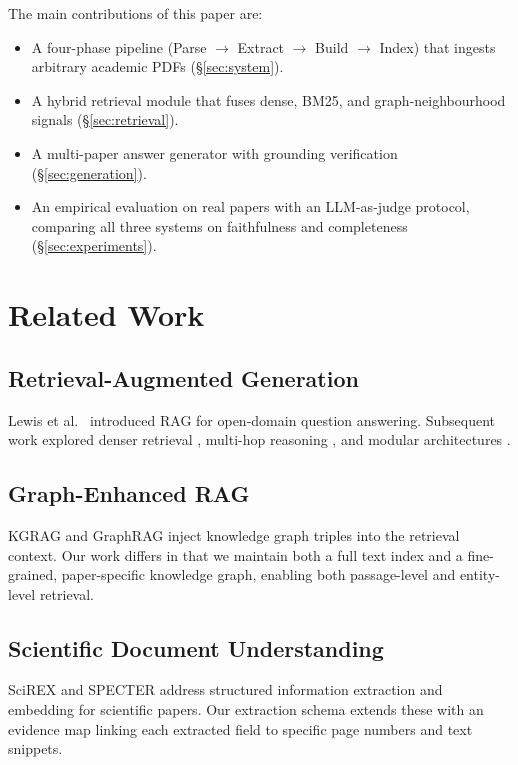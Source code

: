 \documentclass[conference]{IEEEtran}
\begin{document}
The main contributions of this paper are:
\begin{itemize}
  \item A four-phase pipeline (Parse $\to$ Extract $\to$ Build $\to$
  Index) that ingests arbitrary academic PDFs (\S\ref{sec:system}).
  \item A hybrid retrieval module that fuses dense, BM25, and
  graph-neighbourhood signals (\S\ref{sec:retrieval}).
  \item A multi-paper answer generator with grounding verification
  (\S\ref{sec:generation}).
  \item An empirical evaluation on real papers with an LLM-as-judge
  protocol, comparing all three systems on faithfulness and completeness
  (\S\ref{sec:experiments}).
\end{itemize}

\section{Related Work}
\label{sec:related}

\subsection{Retrieval-Augmented Generation}
Lewis et al.~\cite{lewis2020rag} introduced RAG for open-domain question
answering. Subsequent work explored denser retrieval \cite{karpukhin2020dpr},
multi-hop reasoning \cite{xiong2021multihop}, and modular architectures
\cite{gao2023modular}.

\subsection{Graph-Enhanced RAG}
KGRAG \cite{hu2023kgrag} and GraphRAG \cite{edge2024graphrag} inject
knowledge graph triples into the retrieval context. Our work differs in
that we maintain both a full text index and a fine-grained, paper-specific
knowledge graph, enabling both passage-level and entity-level retrieval.

\subsection{Scientific Document Understanding}
SciREX \cite{jain2020scirex} and SPECTER \cite{cohan2020specter} address
structured information extraction and embedding for scientific papers.
Our extraction schema extends these with an evidence map linking each
extracted field to specific page numbers and text snippets.
\end{document}
